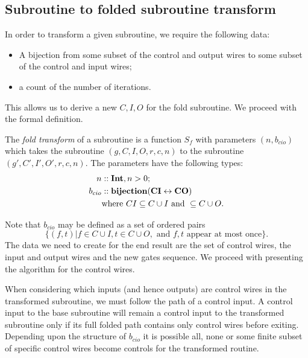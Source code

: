 
\subsection{Subroutine to folded subroutine transform} %
\label{sub:subroutine_to_folded_subroutine_transform}

In order to transform a given subroutine, we require the following data:
\begin{itemize}
  \item A bijection from some subset of the control and output wires to some subset of the control
    and input wires;
  \item a count of the number of iterations.
\end{itemize}

This allows us to derive a new $C,I,O$ for the fold subroutine. We proceed with the formal
definition.
\begin{definition}\label{def:fold_transform_of_a_subroutine}
  The \emph{fold transform} of a subroutine is a function $S_f$ with parameters $(n,b_{cio})$ which
  takes the subroutine $(g,C,I,O,r,c,n)$ to the subroutine $(g',C',I',O',r,c,n)$. The
  parameters have the following types:
  \begin{align*}
    n&::\mathbf{{Int}}, n>0;\\
    b_{cio}&::\mathbf{{bijection(CI \leftrightarrow CO)}} \\
    &\text{where }CI\subseteq C\cup I\text{ and }\subseteq C\cup O.
  \end{align*}
\end{definition}

Note that $b_{cio}$ may be defined as a set of ordered pairs
\begin{equation}
  \{(f,t)|f\in C\cup I, t \in C\cup O,\text{ and } f,t \text{ appear at most once}\}.
  \label{eq:defintion_of_bcio}
\end{equation}
The data we need to create for the end result are the set of control wires, the input and output
wires and the new gates sequence. We proceed with presenting the algorithm for the control wires.

When considering which inputs (and hence outputs) are control wires in the transformed subroutine,
we must follow the path of a control input. A control input to the base subroutine will remain a
control input to the transformed subroutine only if its full folded path contains only control
wires before exiting. Depending upon the structure of $b_{cio}$ it is possible all, none or some
finite subset of specific control wires become controls for the transformed routine.

